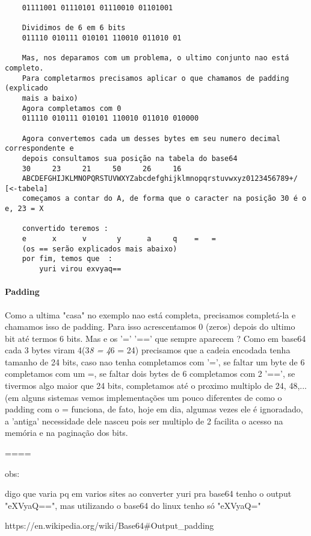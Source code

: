 \documentclass[11pt]{article}
\begin{document}
\begin{verbatim}
    01111001 01110101 01110010 01101001

    Dividimos de 6 em 6 bits
    011110 010111 010101 110010 011010 01

    Mas, nos deparamos com um problema, o ultimo conjunto nao está completo. 
    Para completarmos precisamos aplicar o que chamamos de padding (explicado 
    mais a baixo) 
    Agora completamos com 0
    011110 010111 010101 110010 011010 010000

    Agora convertemos cada um desses bytes em seu numero decimal correspondente e 
    depois consultamos sua posição na tabela do base64
    30     23     21     50     26     16
    ABCDEFGHIJKLMNOPQRSTUVWXYZabcdefghijklmnopqrstuvwxyz0123456789+/ [<-tabela]
    começamos a contar do A, de forma que o caracter na posição 30 é o e, 23 = X
    
    convertido teremos : 
    e      x      v       y      a     q    =   =
    (os == serão explicados mais abaixo) 
    por fim, temos que  : 
        yuri virou exvyaq==
\end{verbatim}

\paragraph{Padding}\label{padding}

Como a ultima "casa" no exemplo nao está completa, precisamos
completá-la e chamamos isso de padding. Para isso acrescentamos 0
(zeros) depois do ultimo bit até termos 6 bits. Mas e os '=' '==' que
sempre aparecem ? Como em base64 cada 3 bytes viram 4(3\emph{8 = 4}6 =
24) precisamos que a cadeia encodada tenha tamanho de 24 bits, caso nao
tenha completamos com '=', se faltar um byte de 6 completamos com um =,
se faltar dois bytes de 6 completamos com 2 '==', se tivermos algo maior
que 24 bits, completamos até o proximo multiplo de 24, 48,... (em alguns
sistemas vemos implementações um pouco diferentes de como o padding com
o = funciona, de fato, hoje em dia, algumas vezes ele é ignoradado, a
'antiga' necessidade dele nasceu pois ser multiplo de 2 facilita o
acesso na memória e na paginação dos bits.

====

obs:

digo que varia pq em varios sites ao converter yuri pra base64 tenho o
output "eXVyaQ==", mas utilizando o base64 do linux tenho só "eXVyaQ="

https://en.wikipedia.org/wiki/Base64\#Output\_padding
\end{document}

